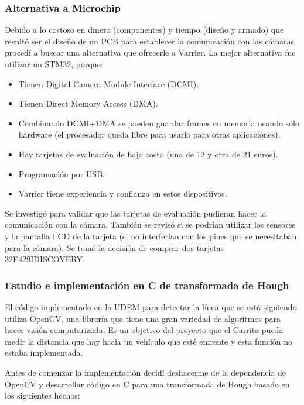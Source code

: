 \subsubsection{Alternativa a Microchip}
Debido a lo costoso en dinero (componentes) y tiempo (diseño y armado) que resultó ser el diseño de un PCB para establecer la comunicación con las cámaras procedí a buscar una alternativa que ofrecerle a Varrier. La mejor alternativa fue utilizar un STM32, porque:
\begin{itemize}
	\item Tienen Digital Camera Module Interface (DCMI).
	\item Tienen Direct Memory Access (DMA).
	\item Combinando DCMI+DMA se pueden guardar frames en memoria usando sólo hardware (el procesador queda libre para usarlo para otras aplicaciones).
	\item Hay tarjetas de evaluación de bajo costo (una de 12 y otra de 21 euros).
	\item Programación por USB.
	\item Varrier tiene experiencia y confianza en estos dispositivos.
\end{itemize}

Se investigó para validar que las tarjetas de evaluación pudieran hacer la comunicación con la cámara. También se revisó si se podrían utilizar los sensores y la pantalla LCD de la tarjeta (si no interferían con los pines que se necesitaban para la cámara). Se tomó la decisión de comprar dos tarjetas 32F429IDISCOVERY.


\subsubsection{Estudio e implementación en C de transformada de Hough}
El código implementado en la UDEM para detectar la línea que se está siguiendo utiliza OpenCV, una librería que tiene una gran variedad de algoritmos para hacer visión computarizada. Es un objetivo del proyecto que el Carrita pueda medir la distancia que hay hacia un vehículo que esté enfrente y esta función no estaba implementada.

Antes de comenzar la implementación decidí deshacerme de la dependencia de OpenCV y desarrollar código en C para una transformada de Hough basado en los siguientes hechos:

